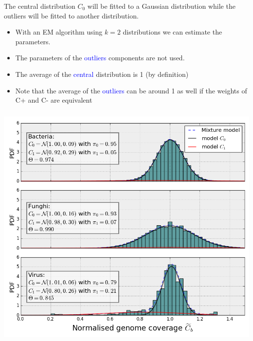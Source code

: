 \documentclass{beamer}
\begin{document}
\begin{frame}
 
The central distribution $C_0$ will be fitted to a Gaussian 
distribution while the outliers will be fitted to another 
distribution.

\begin{itemize}
\item With an EM algorithm using $k=2$ distributions we can estimate the 
parameters. 
\item The parameters of the \textcolor{blue}{outliers} components are not used. 
\item The average of the \textcolor{blue}{central} distribution is  1 (by 
definition)
\item Note that the average of the \textcolor{blue}{outliers} can be around 1 as
well if the weights of C+ and C- are equivalent
\end{itemize}
\end{frame}


\begin{frame}
\frametitle{}
\begin{center}
\includegraphics[height=0.9\textheight, 
    width=1\textwidth]{images/figure_em.png}
\end{center} 
\end{frame}
\end{document}
